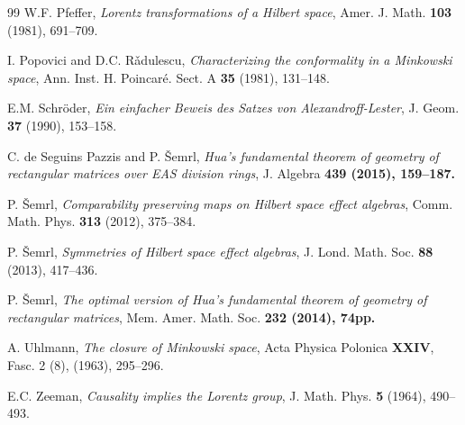 \documentclass[10pt]{amsart}
\theoremstyle{definition}
\theoremstyle{remark}
\numberwithin{subsection}{section}
\numberwithin{equation}{section}
\begin{document}
\begin{thebibliography}{99}
W.F. Pfeffer, \emph{Lorentz transformations of a Hilbert space}, Amer. J. Math. \textbf{103} (1981), 691--709.

I. Popovici and D.C. R\v{a}dulescu, \emph{Characterizing the conformality in a Minkowski space}, Ann. Inst.
H. Poincar\'{e}. Sect. A \textbf{35} (1981), 131--148.

E.M. Schr\" oder,
\emph{Ein einfacher Beweis des Satzes von Alexandroff-Lester}, J. Geom. \textbf{37} (1990),  153--158.

C. de Seguins Pazzis and P. \v Semrl, \emph{Hua's fundamental theorem of geometry of rectangular matrices over EAS division rings}, J. Algebra \bf 439 \rm (2015), 159--187.



P. \v Semrl, \emph{Comparability preserving maps on Hilbert space effect algebras},  Comm. Math. Phys. \textbf{313} (2012), 375--384.

P. \v Semrl, \emph{Symmetries of Hilbert space effect algebras}, J. Lond. Math. Soc. \textbf{88 }(2013), 417--436. 

P. \v Semrl, \emph{The optimal version of Hua's fundamental theorem of geometry of rectangular matrices},  Mem. Amer. Math. Soc. \bf 232 \rm (2014), 74pp.



A. Uhlmann, \emph{The closure of Minkowski space}, Acta Physica Polonica \textbf{XXIV}, Fasc. 2 (8), (1963), 295--296.


E.C. Zeeman, \emph{Causality implies the Lorentz group}, J. Math. Phys. \textbf{5} (1964), 490--493.
\end{thebibliography}


\printindex
\end{document}
